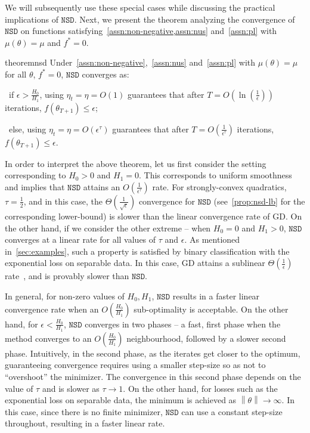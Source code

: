 \documentclass{article}
\newcommand{\norm}[1]{\left\|#1 \right\|}
\newcommand{\etat}{{\eta_t}}
\newcommand{\NSD}{\texttt{NSD}}
\begin{document}
We will subsequently use these special cases while discussing the practical implications of $\NSD$. Next, we present the theorem analyzing the convergence of $\NSD$ on functions satisfying~\cref{assn:non-negative,assn:nus} and~\cref{assn:pl} with $\mu(\theta) = \mu$ and $f^* = 0$. 
\begin{restatable}{theorem}{nsd}
Under~\cref{assn:non-negative},~\cref{assn:nus} and~\cref{assn:pl} with $\mu(\theta) = \mu$ for all $\theta$, $f^* = 0$, $\NSD$ converges as:

\textbullet\ if $\epsilon > \frac{H_0}{H_1}$, using $\etat = \eta = O(1)$ guarantees that after $T = O\left( \ln\left(\frac{1}{\epsilon}\right)\right)$ iterations, $f(\theta_{T+1}) \leq \epsilon$; 

\textbullet\ else, using $\etat = \eta = O(\epsilon^{\tau})$ guarantees that after $T = O \left( \frac{1}{\epsilon^{\tau}} \right)$ iterations, $f(\theta_{T+1}) \leq \epsilon$. 
\label{thm:nsd-pl}
\end{restatable}
In order to interpret the above theorem, let us first consider the setting corresponding to $H_0 > 0$ and $H_1 = 0$. This corresponds to uniform smoothness and implies that $\NSD$ attains an $O\left(\frac{1}{\epsilon^{\tau}}\right)$ rate. For strongly-convex quadratics, $\tau = \frac{1}{2}$, and in this case, the $\Theta\left(\frac{1}{\sqrt{\epsilon}}\right)$ convergence for $\NSD$ (see~\cref{prop:nsd-lb} for the corresponding lower-bound) is slower than the linear convergence rate of GD. On the other hand, if we consider the other extreme -- when $H_0 = 0$ and $H_1 > 0$, $\NSD$ converges at a linear rate for all values of $\tau$ and $\epsilon$. As mentioned in~\cref{sec:examples}, such a property is satisfied by binary classification with the exponential loss on separable data. In this case,  GD attains a sublinear $\Theta\left(\frac{1}{\epsilon}\right)$ rate~\citep{soudry2018implicit}, and is provably slower than $\NSD$. 

In general, for non-zero values of $H_0, H_1$, $\NSD$ results in a faster linear convergence rate when an $O\left(\frac{H_0}{H_1}\right)$ sub-optimality is acceptable. On the other hand, for $\epsilon < \frac{H_0}{H_1}$, $\NSD$ converges in two phases -- a fast, first phase when the method converges to an $O\left(\frac{H_0}{H_1}\right)$ neighbourhood, followed by a slower second phase. Intuitively, in the second phase, as the iterates get closer to the optimum, guaranteeing convergence requires using a smaller step-size so as not to ``overshoot'' the minimizer. The convergence in this second phase depends on the value of $\tau$ and is slower as $\tau \to 1$. On the other hand, for losses such as the exponential loss on separable data, the minimum is achieved as $\norm{\theta} \to \infty$. In this case, since there is no finite minimizer, $\NSD$ can use a constant step-size throughout, resulting in a faster linear rate. 
\end{document}
